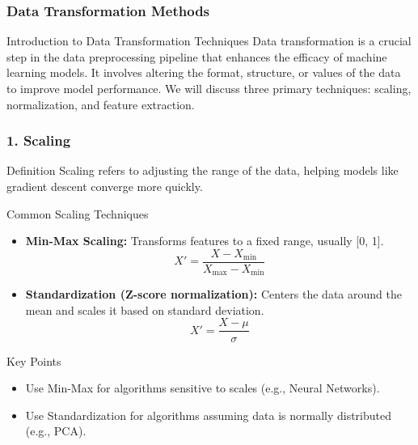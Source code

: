 \documentclass{beamer}
\begin{document}
\begin{frame}
    \frametitle{Data Transformation Methods}
    \begin{block}{Introduction to Data Transformation Techniques}
        Data transformation is a crucial step in the data preprocessing pipeline that enhances the efficacy of machine learning models. 
        It involves altering the format, structure, or values of the data to improve model performance. 
        We will discuss three primary techniques: scaling, normalization, and feature extraction.
    \end{block}
\end{frame}

\begin{frame}
    \frametitle{1. Scaling}
    \begin{block}{Definition}
        Scaling refers to adjusting the range of the data, helping models like gradient descent converge more quickly.
    \end{block}

    \begin{block}{Common Scaling Techniques}
        \begin{itemize}
            \item \textbf{Min-Max Scaling:} Transforms features to a fixed range, usually [0, 1].
            \[
            X' = \frac{X - X_{\text{min}}}{X_{\text{max}} - X_{\text{min}}}
            \]
            \item \textbf{Standardization (Z-score normalization):} Centers the data around the mean and scales it based on standard deviation.
            \[
            X' = \frac{X - \mu}{\sigma}
            \]
        \end{itemize}
    \end{block}
    
    \begin{block}{Key Points}
        \begin{itemize}
            \item Use Min-Max for algorithms sensitive to scales (e.g., Neural Networks).
            \item Use Standardization for algorithms assuming data is normally distributed (e.g., PCA).
        \end{itemize}
    \end{block}
\end{frame}
\end{document}
